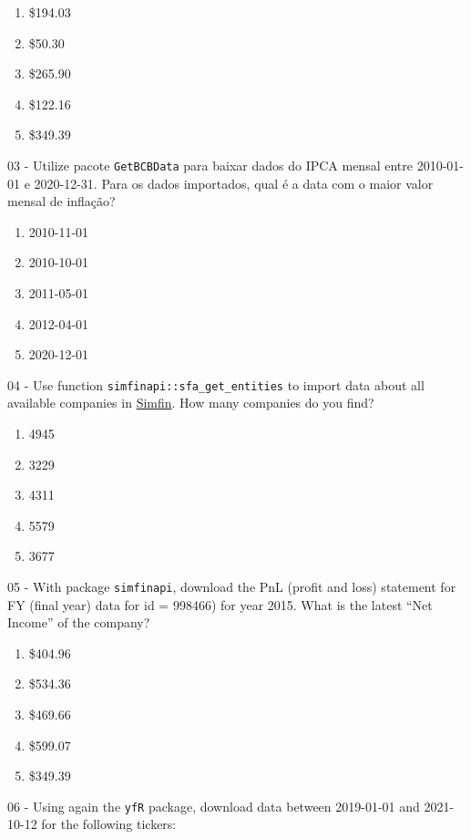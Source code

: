 \documentclass[
  11pt,
]{book}
\providecommand{\tightlist}{%
  \setlength{\itemsep}{0pt}\setlength{\parskip}{0pt}}
\begin{document}
\begin{enumerate}
\def\labelenumi{\alph{enumi})}
\tightlist
\item
  \$194.03
\item
  \$50.30
\item
  \$265.90
\item
  \$122.16
\item
  \$349.39
\end{enumerate}

03 -
Utilize pacote \texttt{GetBCBData} para baixar dados do IPCA mensal entre 2010-01-01 e 2020-12-31. Para os dados importados, qual é a data com o maior valor mensal de inflação?

\begin{enumerate}
\def\labelenumi{\alph{enumi})}
\tightlist
\item
  2010-11-01
\item
  2010-10-01
\item
  2011-05-01
\item
  2012-04-01
\item
  2020-12-01
\end{enumerate}

04 -
Use function \texttt{simfinapi::sfa\_get\_entities} to import data about all available companies in \href{https://simfin.com}{Simfin}. How many companies do you find?

\begin{enumerate}
\def\labelenumi{\alph{enumi})}
\tightlist
\item
  4945
\item
  3229
\item
  4311
\item
  5579
\item
  3677
\end{enumerate}

05 -
With package \texttt{simfinapi}, download the PnL (profit and loss) statement for FY (final year) data for id = 998466) for year 2015. What is the latest ``Net Income'' of the company?

\begin{enumerate}
\def\labelenumi{\alph{enumi})}
\tightlist
\item
  \$404.96
\item
  \$534.36
\item
  \$469.66
\item
  \$599.07
\item
  \$349.39
\end{enumerate}

06 -
Using again the \texttt{yfR} package, download data between 2019-01-01 and 2021-10-12 for the following tickers:
\end{document}
